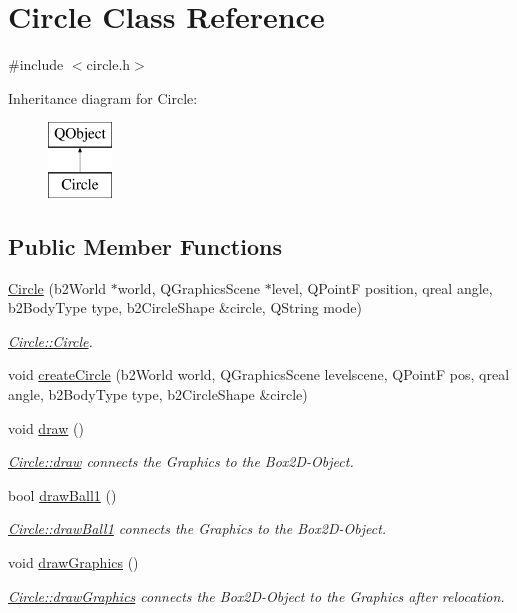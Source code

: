 \hypertarget{class_circle}{}\section{Circle Class Reference}
\label{class_circle}


{\ttfamily \#include $<$circle.\+h$>$}

Inheritance diagram for Circle\+:\begin{figure}[H]
\begin{center}
\leavevmode
\includegraphics[height=2.000000cm]{class_circle}
\end{center}
\end{figure}
\subsection*{Public Member Functions}
\begin{DoxyCompactItemize}
\item 
\hyperlink{class_circle_af0186a5b261937e4902fa143968fb846}{Circle} (b2\+World $\ast$world, Q\+Graphics\+Scene $\ast$level, Q\+PointF position, qreal angle, b2\+Body\+Type type, b2\+Circle\+Shape \&circle, Q\+String mode)
\begin{DoxyCompactList}\small\item\em \hyperlink{class_circle_af0186a5b261937e4902fa143968fb846}{Circle\+::\+Circle}. \end{DoxyCompactList}\item 
void \hyperlink{class_circle_a3a3fea884c3f2865b00190d3c165e7cd}{create\+Circle} (b2\+World world, Q\+Graphics\+Scene levelscene, Q\+PointF pos, qreal angle, b2\+Body\+Type type, b2\+Circle\+Shape \&circle)
\item 
void \hyperlink{class_circle_a3a3f7166e7f629e44f9044b0e537eb22}{draw} ()
\begin{DoxyCompactList}\small\item\em \hyperlink{class_circle_a3a3f7166e7f629e44f9044b0e537eb22}{Circle\+::draw} connects the Graphics to the Box2\+D-\/\+Object. \end{DoxyCompactList}\item 
bool \hyperlink{class_circle_a71e6174daf2374f4c07361ba42c15276}{draw\+Ball1} ()
\begin{DoxyCompactList}\small\item\em \hyperlink{class_circle_a71e6174daf2374f4c07361ba42c15276}{Circle\+::draw\+Ball1} connects the Graphics to the Box2\+D-\/\+Object. \end{DoxyCompactList}\item 
void \hyperlink{class_circle_a62401396510855dbb2e3a2fb3444c90a}{draw\+Graphics} ()
\begin{DoxyCompactList}\small\item\em \hyperlink{class_circle_a62401396510855dbb2e3a2fb3444c90a}{Circle\+::draw\+Graphics} connects the Box2\+D-\/\+Object to the Graphics after relocation. \end{DoxyCompactList}\end{DoxyCompactItemize}
